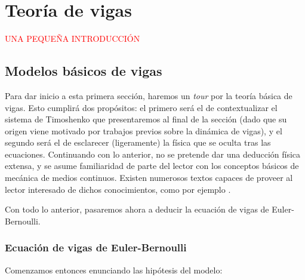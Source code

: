\chapter{Teoría de vigas}
\label{ch:teoriaVigas}

\textcolor{red}{UNA PEQUEÑA INTRODUCCIÓN}

\section{Modelos básicos de vigas}
\label{ch:teoriaVigas:section:primerosmodelos}

Para dar inicio a esta primera sección, haremos un \textit{tour} por la teoría básica de vigas. Esto cumplirá dos propósitos: el primero será el de contextualizar el sistema de Timoshenko que presentaremos al final de la sección (dado que su origen viene motivado por trabajos previos sobre la dinámica de vigas), y el segundo será el de esclarecer (ligeramente) la física que se oculta tras las ecuaciones. Continuando con lo anterior, no se pretende dar una deducción física extensa, y se asume familiaridad de parte del lector con los conceptos básicos de mecánica de medios continuos. Existen numerosos textos capaces de proveer al lector interesado de dichos conocimientos, como por ejemplo \cite{gurtin-1982-int-con-mec}.

Con todo lo anterior, pasaremos ahora a deducir la ecuación de vigas de Euler-Bernoulli.

\subsection{Ecuación de vigas de Euler-Bernoulli}
\label{ch:teoriaVigas:section:primerosmodelos:subsection:eulerbernoulli}

Comenzamos entonces enunciando las hipótesis del modelo:

